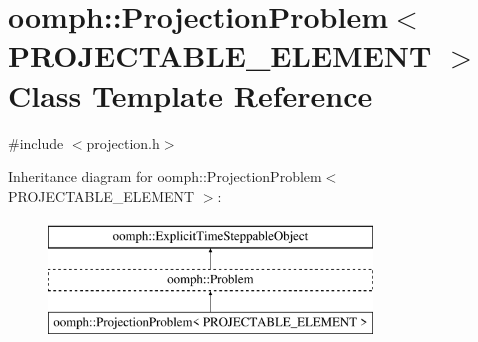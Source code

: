 \hypertarget{classoomph_1_1ProjectionProblem}{}\section{oomph\+:\+:Projection\+Problem$<$ P\+R\+O\+J\+E\+C\+T\+A\+B\+L\+E\+\_\+\+E\+L\+E\+M\+E\+NT $>$ Class Template Reference}
\label{classoomph_1_1ProjectionProblem}


{\ttfamily \#include $<$projection.\+h$>$}

Inheritance diagram for oomph\+:\+:Projection\+Problem$<$ P\+R\+O\+J\+E\+C\+T\+A\+B\+L\+E\+\_\+\+E\+L\+E\+M\+E\+NT $>$\+:\begin{figure}[H]
\begin{center}
\leavevmode
\includegraphics[height=3.000000cm]{classoomph_1_1ProjectionProblem}
\end{center}
\end{figure}
